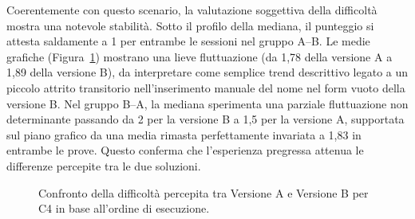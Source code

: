 Coerentemente con questo scenario, la valutazione soggettiva della difficoltà mostra una notevole stabilità. Sotto il profilo della mediana, il punteggio si attesta saldamente a 1 per entrambe le sessioni nel gruppo A--B. Le medie grafiche (Figura~\ref{fig:6-c4-2}) mostrano una lieve fluttuazione (da 1,78 della versione A a 1,89 della versione B), da interpretare come semplice trend descrittivo legato a un piccolo attrito transitorio nell'inserimento manuale del nome nel form vuoto della versione B. Nel gruppo B--A, la mediana sperimenta una parziale fluttuazione non determinante passando da 2 per la versione B a 1,5 per la versione A, supportata sul piano grafico da una media rimasta perfettamente invariata a 1,83 in entrambe le prove. Questo conferma che l'esperienza pregressa attenua le differenze percepite tra le due soluzioni.

\begin{figure}[H]
	\centering
	\caption{Confronto della difficoltà percepita tra Versione A e Versione B per C4 in base all'ordine di esecuzione.}
	\label{fig:6-c4-2}
\end{figure}
